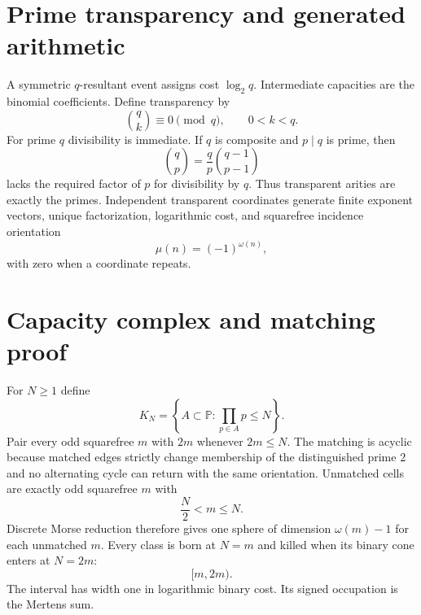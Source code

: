 \documentclass[11pt,a4paper]{article}
\begin{document}
\section{Prime transparency and generated arithmetic}
A symmetric $q$-resultant event assigns cost $\log_2q$. Intermediate capacities are the binomial coefficients. Define transparency by
\begin{equation}
\binom qk\equiv0\pmod q,\qquad0<k<q.
\end{equation}
For prime $q$ divisibility is immediate. If $q$ is composite and $p\mid q$ is prime, then
\begin{equation}
\binom qp=\frac qp\binom{q-1}{p-1}
\end{equation}
lacks the required factor of $p$ for divisibility by $q$. Thus transparent arities are exactly the primes. Independent transparent coordinates generate finite exponent vectors, unique factorization, logarithmic cost, and squarefree incidence orientation
\begin{equation}
\mu(n)=(-1)^{\omega(n)},
\end{equation}
with zero when a coordinate repeats.

\section{Capacity complex and matching proof}
For $N\ge1$ define
\begin{equation}
K_N=\left\{A\subset\mathbb P:\prod_{p\in A}p\le N\right\}.
\end{equation}
Pair every odd squarefree $m$ with $2m$ whenever $2m\le N$. The matching is acyclic because matched edges strictly change membership of the distinguished prime 2 and no alternating cycle can return with the same orientation. Unmatched cells are exactly odd squarefree $m$ with
\begin{equation}
\frac N2<m\le N.
\end{equation}
Discrete Morse reduction therefore gives one sphere of dimension $\omega(m)-1$ for each unmatched $m$. Every class is born at $N=m$ and killed when its binary cone enters at $N=2m$:
\begin{equation}
\boxed{[m,2m)}.
\end{equation}
The interval has width one in logarithmic binary cost. Its signed occupation is the Mertens sum.
\end{document}
